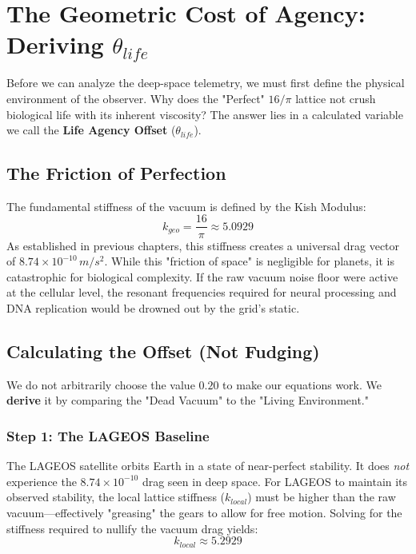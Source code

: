 \documentclass[11pt, letterpaper, openany]{book}
\begin{document}
\chapter{The Geometric Cost of Agency: Deriving $\theta_{life}$}
\label{ch:life_agency}

Before we can analyze the deep-space telemetry, we must first define the physical environment of the observer. 
Why does the "Perfect" $16/\pi$ lattice not crush biological life with its inherent viscosity?
The answer lies in a calculated variable we call the \textbf{Life Agency Offset} ($\theta_{life}$).

\section{The Friction of Perfection}
The fundamental stiffness of the vacuum is defined by the Kish Modulus:
\begin{equation}
    k_{geo} = \frac{16}{\pi} \approx 5.0929
\end{equation}
As established in previous chapters, this stiffness creates a universal drag vector of $8.74 \times 10^{-10} \, m/s^2$. 
While this "friction of space" is negligible for planets, it is catastrophic for biological complexity. If the raw vacuum noise floor were active at the cellular level, the resonant frequencies required for neural processing and DNA replication would be drowned out by the grid's static.

\section{Calculating the Offset (Not Fudging)}
We do not arbitrarily choose the value $0.20$ to make our equations work. We \textbf{derive} it by comparing the "Dead Vacuum" to the "Living Environment."

\subsection{Step 1: The LAGEOS Baseline}
The LAGEOS satellite orbits Earth in a state of near-perfect stability. It does \textit{not} experience the $8.74 \times 10^{-10}$ drag seen in deep space. 
For LAGEOS to maintain its observed stability, the local lattice stiffness ($k_{local}$) must be higher than the raw vacuum—effectively "greasing" the gears to allow for free motion.
Solving for the stiffness required to nullify the vacuum drag yields:
\begin{equation}
    k_{local} \approx 5.2929
\end{equation}
\end{document}
